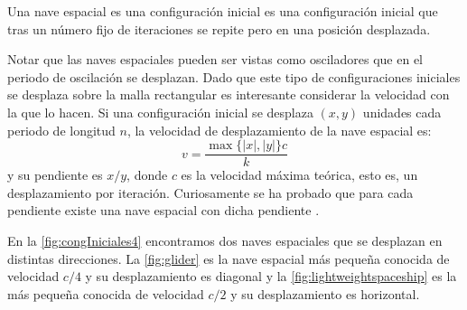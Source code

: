 \documentclass[../proyecto.tex]{memoir}
\begin{document}

\begin{defi}
Una  nave espacial es una configuración inicial es una configuración inicial que tras un número fijo de iteraciones se repite pero en una posición desplazada.
\end{defi}

Notar que las naves espaciales pueden ser vistas como osciladores que en el periodo de oscilación se desplazan. Dado que este tipo de configuraciones iniciales se desplaza sobre la malla rectangular es interesante considerar la velocidad con la que lo hacen. Si una configuración inicial se desplaza $(x, y)$ unidades cada periodo de longitud $n$, la velocidad de desplazamiento de la nave espacial es: $$
 v = \frac{\max\{|x|,|y|\}c}{k}
$$ 
y su pendiente es $x/y$, donde $c$ es la velocidad máxima teórica, esto es, un desplazamiento por iteración. Curiosamente se ha probado que para cada pendiente existe una nave espacial con dicha pendiente \cite{pendienteNaves}.

En la \autoref{fig:congIniciales4} encontramos dos naves espaciales que se desplazan en distintas direcciones. La \autoref{fig:glider} es la nave espacial más pequeña conocida de velocidad $c/4$ y su desplazamiento es diagonal y la \autoref{fig:lightweightspaceship} es la más pequeña conocida de velocidad $c/2$ y su desplazamiento es horizontal.
\end{document}
